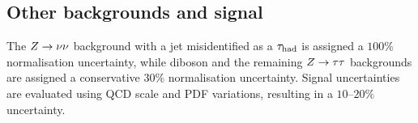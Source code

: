\subsection{Other backgrounds and signal}
\label{subsec:ch9_signal}
The $Z\rightarrow\nu\nu$ background with a jet misidentified as a $\tau_{\mathrm{had}}$ is assigned a $100\%$ normalisation uncertainty, while diboson and the remaining $Z\rightarrow\tau\tau$ backgrounds are assigned a conservative $30\%$ normalisation uncertainty.
Signal uncertainties are evaluated using QCD scale and PDF variations, resulting in a $10$--$20\%$ uncertainty.

